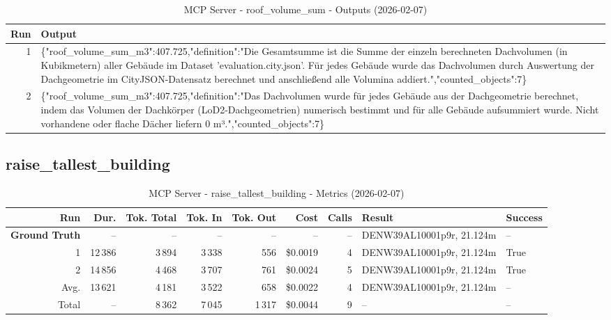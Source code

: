 \documentclass[a4paper,11pt]{article}
\begin{document}
\begin{table}[ht]
\centering
\scriptsize
\caption{MCP Server - roof\_volume\_sum - Outputs (2026-02-07)}
\label{tab:mcp\_roof\_volume\_sum\_outputs\_2026-02-07}
\begin{tabular}{r p{12cm}}
\hline
Run & Output \\
\hline
1 & \{"roof\_volume\_sum\_m3":407.725,"definition":"Die Gesamtsumme ist die Summe der einzeln berechneten Dachvolumen (in Kubikmetern) aller Gebäude im Dataset 'evaluation.city.json'. Für jedes Gebäude wurde das Dachvolumen durch Auswertung der Dachgeometrie im CityJSON-Datensatz berechnet und anschließend alle Volumina addiert.","counted\_objects":7\} \\
2 & \{"roof\_volume\_sum\_m3":407.725,"definition":"Das Dachvolumen wurde für jedes Gebäude aus der Dachgeometrie berechnet, indem das Volumen der Dachkörper (LoD2-Dachgeometrien) numerisch bestimmt und für alle Gebäude aufsummiert wurde. Nicht vorhandene oder flache Dächer liefern 0 m³.","counted\_objects":7\} \\
\hline
\end{tabular}
\end{table}

\clearpage
\subsection{raise\_tallest\_building}

\begin{table}[ht]
\centering
\scriptsize
\caption{MCP Server - raise\_tallest\_building - Metrics (2026-02-07)}
\label{tab:mcp\_raise\_tallest\_building\_metrics\_2026-02-07}
\begin{tabular}{r r r r r r r p{3cm} l}
\hline
Run & Dur. & Tok. Total & Tok. In & Tok. Out & Cost & Calls & Result & Success \\
\hline
\textbf{Ground Truth} & -- & -- & -- & -- & -- & -- & DENW39AL10001p9r, 21.124m & -- \\
\hline
1 & 12\,386 & 3\,894 & 3\,338 & 556 & \$0.0019 & 4 & DENW39AL10001p9r, 21.124m & True \\
2 & 14\,856 & 4\,468 & 3\,707 & 761 & \$0.0024 & 5 & DENW39AL10001p9r, 21.124m & True \\
\hline
Avg. & 13\,621 & 4\,181 & 3\,522 & 658 & \$0.0022 & 4 & DENW39AL10001p9r, 21.124m & -- \\
Total & -- & 8\,362 & 7\,045 & 1\,317 & \$0.0044 & 9 & -- & -- \\
\hline
\end{tabular}
\end{table}
\end{document}
